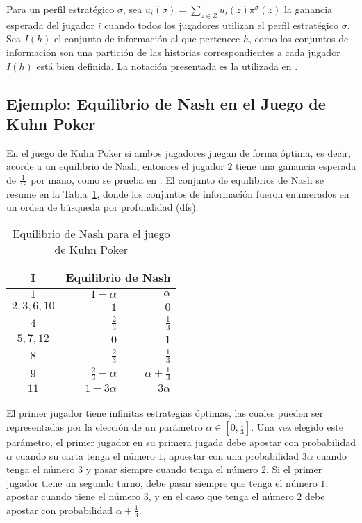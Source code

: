 Para un perfil estratégico $\sigma$, sea $u_i(\sigma) = \sum_{z \in Z} u_i(z)\pi^{\sigma}(z)$ la ganancia esperada del jugador $i$ cuando todos los jugadores utilizan el perfil estratégico $\sigma$. Sea $I(h)$ el conjunto de información al que pertenece $h$, como los conjuntos de información son una partición de las historias correspondientes a cada jugador $I(h)$ está bien definida. La notación presentada es la utilizada en \cite{bib:cfr}.

\subsection*{Ejemplo: Equilibrio de Nash en el Juego de Kuhn Poker}

En el juego de Kuhn Poker si ambos jugadores juegan de forma óptima, es decir, acorde a un equilibrio de Nash, entonces el jugador $2$ tiene una ganancia esperada de $\frac{1}{18}$ por mano, como se prueba en \cite{bib:kuhn-poker}. El conjunto de equilibrios de Nash se resume en la Tabla~\ref{tab:estrategia-kuhn-poker}, donde los conjuntos de información fueron enumerados en un orden de búsqueda por profundidad (dfs).

\begin{table}[hbt]
    \centering
    \begin{tabular}{c|r r}
        \hline
        I & \multicolumn{2}{|c}{Equilibrio de Nash}  \\ \hline
         $1$ & $1-\alpha$ & $\alpha$ \\
         $2, 3, 6, 10$ & $1$ & $0$ \\
         $4$ & $\frac{2}{3}$ & $\frac{1}{3}$ \\
         $5, 7, 12$ & $0$ & $1$ \\
         $8$ & $\frac{2}{3}$ & $\frac{1}{3}$ \\
         $9$ & $\frac{2}{3} - \alpha$ & $\alpha + \frac{1}{3}$ \\
        $11$ & $1 - 3 \alpha$ & $3 \alpha$ \\ \hline
    \end{tabular}
    \caption{Equilibrio de Nash para el juego de Kuhn Poker}
    \label{tab:estrategia-kuhn-poker}
\end{table}

El primer jugador tiene infinitas estrategias óptimas, las cuales pueden ser representadas por la elección de un parámetro $\alpha \in [ 0, \frac{1}{3} ]$. Una vez elegido este parámetro, el primer jugador en su primera jugada debe apostar con probabilidad $\alpha$ cuando su carta tenga el número $1$, apuestar con una probabilidad $3 \alpha$ cuando tenga el número $3$ y pasar siempre cuando tenga el número $2$. Si el primer jugador tiene un segundo turno, debe pasar siempre que tenga el número $1$, apostar cuando tiene el número $3$, y en el caso que tenga el número $2$ debe apostar con probabilidad $\alpha + \frac{1}{3}$.

